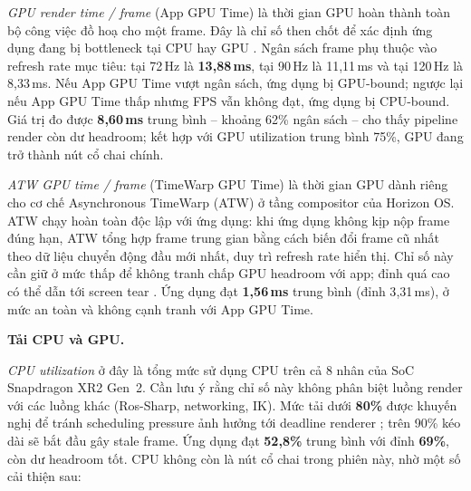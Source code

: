 \textit{GPU render time / frame} (App GPU Time) là thời gian GPU hoàn thành toàn bộ công việc
đồ hoạ cho một frame. Đây là chỉ số then chốt để xác định ứng dụng đang bị bottleneck tại
CPU hay GPU \cite{meta_ovr_best_practices}. Ngân sách frame phụ thuộc vào refresh rate mục
tiêu: tại 72\,Hz là \textbf{13{,}88\,ms}, tại 90\,Hz là 11{,}11\,ms và tại 120\,Hz là
8{,}33\,ms. Nếu App GPU Time vượt ngân sách, ứng dụng bị GPU-bound; ngược lại nếu App GPU
Time thấp nhưng FPS vẫn không đạt, ứng dụng bị CPU-bound. Giá trị đo được \textbf{8{,}60\,ms}
trung bình -- khoảng 62\% ngân sách -- cho thấy pipeline render còn dư headroom; kết hợp với
GPU utilization trung bình 75\%, GPU đang trở thành nút cổ chai chính.

\textit{ATW GPU time / frame} (TimeWarp GPU Time) là thời gian GPU dành riêng cho cơ chế
Asynchronous TimeWarp (ATW) ở tầng compositor của Horizon OS. ATW chạy hoàn toàn độc lập
với ứng dụng: khi ứng dụng không kịp nộp frame đúng hạn, ATW tổng hợp frame trung gian
bằng cách biến đổi frame cũ nhất theo dữ liệu chuyển động đầu mới nhất, duy trì refresh
rate hiển thị. Chỉ số này cần giữ ở mức thấp để không tranh chấp GPU headroom với app;
đỉnh quá cao có thể dẫn tới screen tear \cite{meta_ovr_stats}. Ứng dụng đạt
\textbf{1{,}56\,ms} trung bình (đỉnh 3{,}31\,ms), ở mức an toàn và không cạnh tranh với
App GPU Time.

\textbf{Tải CPU và GPU.}

\textit{CPU utilization} ở đây là tổng mức sử dụng CPU trên cả 8 nhân của SoC Snapdragon
XR2 Gen~2. Cần lưu ý rằng chỉ số này không phân biệt luồng render với các luồng khác
(Ros-Sharp, networking, IK). Mức tải dưới \textbf{80\%} được khuyến nghị để tránh scheduling
pressure ảnh hưởng tới deadline renderer \cite{meta_ovr_stats}; trên 90\% kéo dài sẽ bắt
đầu gây stale frame. Ứng dụng đạt \textbf{52{,}8\%} trung bình với đỉnh \textbf{69\%},
còn dư headroom tốt. CPU không còn là nút cổ chai trong phiên này, nhờ một số cải thiện sau:

